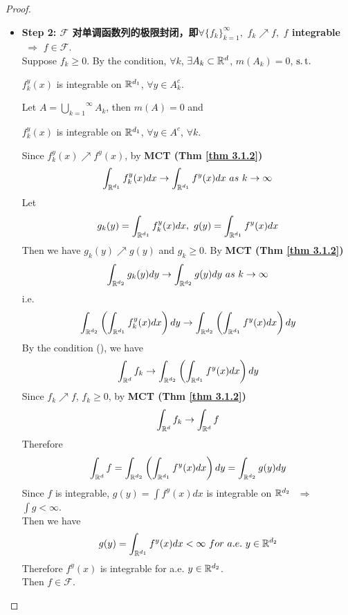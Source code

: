 \begin{proof}
\begin{itemize}
			\newpage
			
			\item \textbf{Step 2: $\mathcal{F}$ 对单调函数列的极限封闭，即$\forall \{ f_k \}_{k = 1}^{\infty} , \,\, f_k \nearrow f , \,\, f$ integrable $ \,\, \Rightarrow \,\, f \in \mathcal{F}$}. \\
			Suppose $f_k \geq 0$. By the condition, $\forall k$, $\exists A_k \subset \mathbb{R}^d$, $m(A_k) = 0$, $\operatorname{s.t.}$
			\begin{center}
				$f_{k}^{y}(x)$ is integrable on $\mathbb{R}^{d_1}$, $\forall y \in A_{k}^c$.
			\end{center}
			Let $A = \overset{\infty}{\underset{k = 1}{\bigcup}}{A_k}$, then $m(A) = 0$ and
			\begin{center}
				$f_{k}^{y}(x)$ is integrable on $\mathbb{R}^{d_1}$, $\forall y \in A^c$, $\forall k$.
			\end{center}
			Since $f_{k}^{y}(x) \nearrow f^{y}(x)$, by \textbf{MCT (Thm \ref{thm 3.1.2})}
			\begin{align}
				\int_{\mathbb{R}^{d_1}}{f_{k}^{y}(x) dx} \to \int_{\mathbb{R}^{d_1}}{f^{y}(x) dx} \,\, as \,\, k \to \infty
			\end{align}
			Let 
			\begin{align}
				g_{k}(y) = \int_{\mathbb{R}^{d_1}}{f_{k}^{y}(x) dx} , \,\, g(y) = \int_{\mathbb{R}^{d_1}}{f^{y}(x) dx}
			\end{align}
			Then we have $g_{k}(y) \nearrow g(y)$ and $g_k \geq 0$. By \textbf{MCT (Thm \ref{thm 3.1.2})}
			\begin{align}
				\int_{\mathbb{R}^{d_2}}{g_{k}(y) dy} \to \int_{\mathbb{R}^{d_2}}{g(y) dy} \,\, as \,\, k \to \infty
			\end{align}
			i.e.
			\begin{align}
				\int_{\mathbb{R}^{d_2}}{\left( \int_{\mathbb{R}^{d_1}}{f_{k}^{y}(x) dx} \right) dy} \to \int_{\mathbb{R}^{d_2}}{\left( \int_{\mathbb{R}^{d_1}}{f^{y}(x) dx} \right) dy}
			\end{align}
			By the condition (), we have
			\begin{align}
				\int_{\mathbb{R}^d}{f_k} \to \int_{\mathbb{R}^{d_2}}{\left( \int_{\mathbb{R}^{d_1}}{f^{y}(x) dx} \right) dy}
			\end{align}
			Since $f_k \nearrow f$, $f_k \geq 0$, by \textbf{MCT (Thm \ref{thm 3.1.2})}
			\begin{align}
				\int_{\mathbb{R}^d}{f_k} \to \int_{\mathbb{R}^d}{f}
			\end{align}
			Therefore
			\begin{align}
				\int_{\mathbb{R}^d}{f} = \int_{\mathbb{R}^{d_2}}{\left( \int_{\mathbb{R}^{d_1}}{f^{y}(x) dx} \right) dy} = \int_{\mathbb{R}^{d_2}}{g(y) dy}
			\end{align}
			Since $f$ is integrable, $g(y) = \int{f^{y}(x) dx}$ is integrable on $\mathbb{R}^{d_2}$ $\,\, \Rightarrow \,\,$ $\int{g} < \infty$.\\
			Then we have
			\begin{align}
				g(y) = \int_{\mathbb{R}^{d_1}}{f^{y}(x) dx} < \infty \,\, for \,\, a.e. \,\, y \in \mathbb{R}^{d_2}
			\end{align}
			Therefore $f^{y}(x)$ is integrable for a.e. $y \in \mathbb{R}^{d_2}$. \\
			Then $f \in \mathcal{F}$.
			

\end{itemize}
\end{proof}
